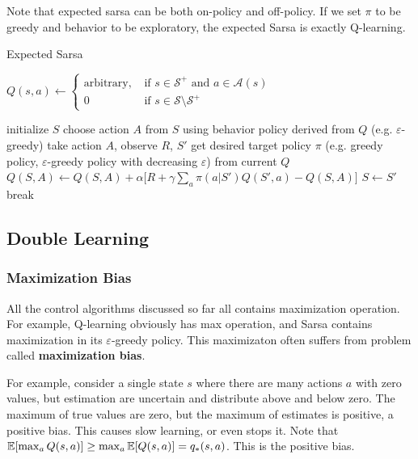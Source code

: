 \documentclass[../../main.tex]{subfiles}
\begin{document}
        Note that expected sarsa can be both on-policy and off-policy. If we set $\pi$ to be greedy and behavior to be exploratory, the
        expected Sarsa is exactly Q-learning.

        {Expected Sarsa}
        {\inputitem{$\alpha \in (0,1]$}{step size parameter}}
        {}
        {
            {$Q(s,a) \leftarrow
            \begin{cases}
                \text{arbitrary,} &\text{ if $s \in \mathcal{S}^+$ and $a \in \mathcal{A}(s)$} \\
                0 &\text{ if $s \in \mathcal{S} \setminus \mathcal{S}^+$}
            \end{cases}$\;}

            {
                initialize $S$\;
                {
                    choose action $A$ from $S$ using behavior policy derived from $Q$ (e.g. $\varepsilon$-greedy)\;
                    take action $A$, observe $R$, $S'$\;
                    get desired target policy $\pi$ (e.g. greedy policy, $\varepsilon$-greedy policy with decreasing $\varepsilon$) from current $Q$\;
                    $Q(S,A) \leftarrow Q(S,A) + \alpha\big[ R + \gamma \sum_a \pi(a|S')Q(S',a) - Q(S,A) \big]$\;
                    $S \leftarrow S'$\;
                    {
                        break
                    }
                }
            }
        }

    \subsection{Double Learning}
        \subsubsection{Maximization Bias}
            All the control algorithms discussed so far all contains maximization operation. For example, Q-learning obviously has max operation,
            and Sarsa contains maximization in its $\varepsilon$-greedy policy. This maximizaton often suffers from problem called
            \textbf{maximization bias}.
            
            For example, consider a single state $s$ where there are many actions $a$ with zero values, but estimation are uncertain and distribute
            above and below zero. The maximum of true values are zero, but the maximum of estimates is positive, a positive bias.
            This causes slow learning, or even stops it. Note that $\mathbb{E}[\max_a{Q(s,a)}] \geq \max_a{\mathbb{E}[Q(s,a)]} = q_*(s,a)$. This is the positive bias.
\end{document}
